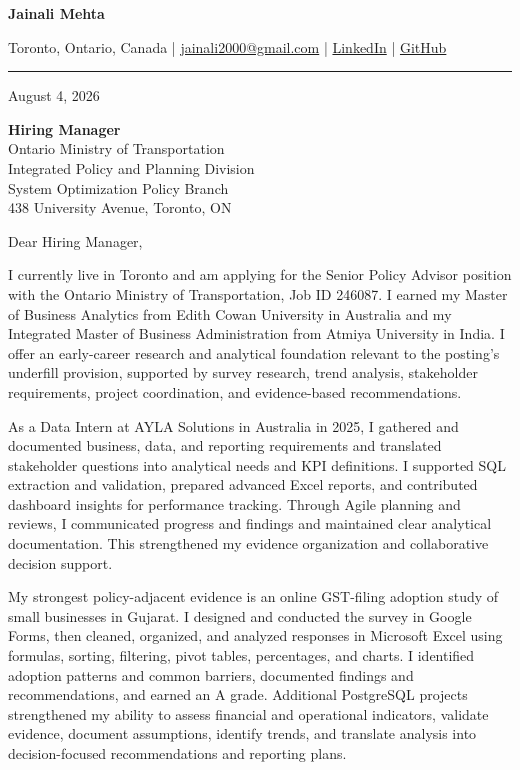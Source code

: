 \documentclass[letterpaper,10pt]{article}
\begin{document}
\begin{center}
  {\fontsize{17}{19}\selectfont\textbf{Jainali Mehta}}\par\vspace{2pt}
  \small Toronto, Ontario, Canada \;|\;
  \href{mailto:jainali2000@gmail.com}{jainali2000@gmail.com} \;|\;
  \href{https://www.linkedin.com/in/jainali-mehta}{LinkedIn} \;|\;
  \href{https://github.com/jainalimehta}{GitHub}
\end{center}
\vspace{-5pt}
\noindent\rule{\textwidth}{0.4pt}

August 4, 2026

\textbf{Hiring Manager}\\
Ontario Ministry of Transportation\\
Integrated Policy and Planning Division\\
System Optimization Policy Branch\\
438 University Avenue, Toronto, ON

Dear Hiring Manager,

I currently live in Toronto and am applying for the Senior Policy Advisor position with the Ontario Ministry of Transportation, Job ID 246087. I earned my Master of Business Analytics from Edith Cowan University in Australia and my Integrated Master of Business Administration from Atmiya University in India. I offer an early-career research and analytical foundation relevant to the posting's underfill provision, supported by survey research, trend analysis, stakeholder requirements, project coordination, and evidence-based recommendations.

As a Data Intern at AYLA Solutions in Australia in 2025, I gathered and documented business, data, and reporting requirements and translated stakeholder questions into analytical needs and KPI definitions. I supported SQL extraction and validation, prepared advanced Excel reports, and contributed dashboard insights for performance tracking. Through Agile planning and reviews, I communicated progress and findings and maintained clear analytical documentation. This strengthened my evidence organization and collaborative decision support.

My strongest policy-adjacent evidence is an online GST-filing adoption study of small businesses in Gujarat. I designed and conducted the survey in Google Forms, then cleaned, organized, and analyzed responses in Microsoft Excel using formulas, sorting, filtering, pivot tables, percentages, and charts. I identified adoption patterns and common barriers, documented findings and recommendations, and earned an A grade. Additional PostgreSQL projects strengthened my ability to assess financial and operational indicators, validate evidence, document assumptions, identify trends, and translate analysis into decision-focused recommendations and reporting plans.
\end{document}

